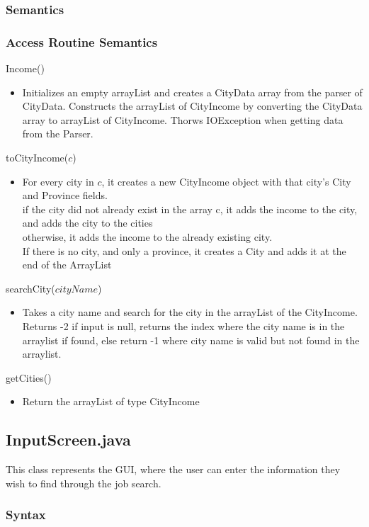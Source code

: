 \documentclass[12pt,fleqn]{article}
\begin{document}
\subsubsection*{Semantics}
\subsubsection*{Access Routine Semantics}
\noindent Income()
\begin{itemize}
\item Initializes an empty arrayList and creates a CityData array from the parser of CityData. Constructs the
arrayList of CityIncome by converting the CityData array to arrayList of CityIncome. Thorws IOException
when getting data from the Parser.
\end{itemize}
\noindent toCityIncome($c$)
\begin{itemize}
\item For every city in $c$, it creates a new CityIncome object with that city's City and Province fields.
\\if the city did not already exist in the array c, it adds the income to the city, and adds the city to the cities
\\otherwise, it adds the income to the already existing city.
\\If there is no city, and only a province,  it creates a City and adds it at the end of the ArrayList
\end{itemize}
\noindent searchCity($cityName$)
\begin{itemize}
\item Takes a city name and search for the city in the arrayList of the CityIncome. Returns -2 if input is null,
returns the index where the city name is in the arraylist if found, else return -1 where city name is valid
but not found in the arraylist.
\end{itemize}
\noindent getCities()
\begin{itemize}
\item Return the arrayList of type CityIncome
\end{itemize}


\subsection*{InputScreen.java}\label{input}
This class represents the GUI, where the user can enter the information they wish to find through the job search.
\subsubsection* {Syntax}
\end{document}
